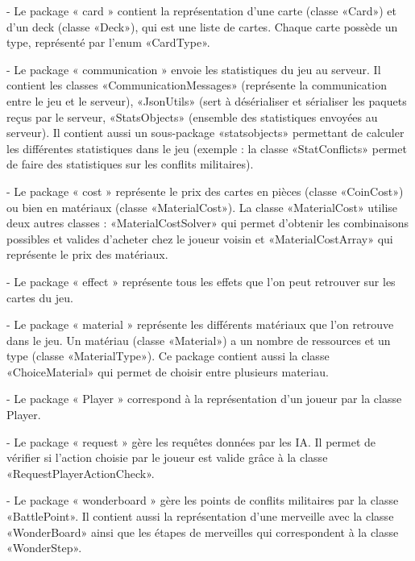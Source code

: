 \documentclass[13pt ,a4paper ]{report}
\begin{document}
\begin{multicols}{2}
\begin{flushleft}
- Le package « card » contient la représentation d’une carte (classe «Card») et d’un deck (classe «Deck»), qui est une liste de cartes. Chaque carte possède un type, représenté par l’enum «CardType».
\newline

- Le package « communication » envoie les statistiques du jeu au serveur. Il contient les classes «CommunicationMessages» (représente la communication entre le jeu et le serveur), «JsonUtils» (sert à désérialiser et sérialiser les paquets reçus par le serveur, «StatsObjects» (ensemble des statistiques envoyées au serveur). Il contient aussi un sous-package «statsobjects» permettant de calculer les différentes statistiques dans le jeu (exemple : la classe «StatConflicts» permet de faire des statistiques sur les conflits militaires).
\newline

- Le package « cost » représente le prix des cartes en pièces (classe «CoinCost») ou bien en matériaux (classe «MaterialCost»). La classe «MaterialCost» utilise deux autres classes : «MaterialCostSolver» qui permet d’obtenir les combinaisons possibles et valides d’acheter chez le joueur voisin et «MaterialCostArray» qui représente le prix des matériaux.
\newline

- Le package « effect » représente tous les effets que l’on peut retrouver sur les cartes du jeu. 
\newline

- Le package « material » représente les différents matériaux que l’on retrouve dans le jeu. Un matériau (classe «Material») a un nombre de ressources et un type (classe «MaterialType»). Ce package contient aussi la classe «ChoiceMaterial» qui permet de choisir entre plusieurs materiau.
\newline

- Le package « Player » correspond à la représentation d’un joueur par la classe Player.
\newline

- Le package « request » gère les requêtes données par les IA. Il permet de vérifier si l’action choisie par le joueur est valide grâce à la classe «RequestPlayerActionCheck».
\newline

- Le package « wonderboard » gère les points de conflits militaires par la classe «BattlePoint». Il contient aussi la représentation d’une merveille avec la classe «WonderBoard» ainsi que les étapes de merveilles qui correspondent à la classe «WonderStep».



\end{flushleft}
\end{multicols}
\end{document}

